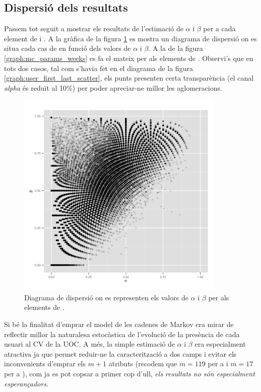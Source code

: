 \documentclass[
	a4paper,
	twoside,
	justified
]{tufte-book}
\begin{document}
\subsection{Dispersió dels resultats}

Passem tot seguit a mostrar els resultats de l'estimació de $\alpha$ i $\beta$ per a cada element de  i . A la gràfica de la figura \ref{graph:mc_params_days} es mostra un diagrama de dispersió on es situa cada cas de  en funció dels valors de $\alpha$ i $\beta$. A la de la figura \ref{graph:mc_params_weeks} es fa el mateix per als elements de . Observi's que en tots dos casos, tal com s'havia fet en el diagrama de la figura \ref{graph:user_first_last_scatter}, els punts presenten certa transparència (el canal \emph{alpha} és reduït al 10\%) per poder apreciar-ne millor les aglomeracions.  

\begin{figure}
\begin{center}
\includegraphics[width=10cm]{mc_params_days}
\caption{
\label{graph:mc_params_days}
	Diagrama de dispersió on es representen els valors de $\alpha$ i $\beta$ per als elements de .
}
\end{center}
\end{figure}

Si bé la finalitat d'emprar el model de les cadenes de Markov era mirar de reflectir millor la naturalesa estocàstica de l'evolució de la presència de cada usuari al CV de la UOC. A més, la simple estimació de $\alpha$ i $\beta$ era especialment atractiva ja que permet reduir-ne la caracterització a dos camps i evitar els inconvenients d'emprar els $m+1$ atributs (recodem que $m = 119$ per a  i $m = 17$ per a ), com ja es pot copsar a primer cop d'ull, \emph{els resultats no són especialment esperançadors}.  
\end{document}

